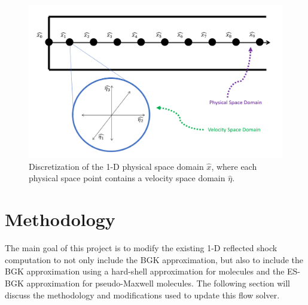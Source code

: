 \documentclass[a4paper]{article}
\begin{document}
\begin{figure}[hbt!]
    \centering
    \includegraphics[width=14cm]{imgs/Domain_Description.png}
    \caption{\centering Discretization of the 1-D physical space domain $\hat{x}$, where each physical space point contains a velocity space domain $\hat{\eta}$.}
    \label{fig2}
\end{figure}

\section{Methodology}
The main goal of this project is to modify the existing 1-D reflected shock computation to not only include the BGK approximation, but also to include the BGK approximation using a hard-shell approximation for molecules and the ES-BGK approximation for pseudo-Maxwell molecules.  The following section will discuss the methodology and modifications used to update this flow solver.
\end{document}
